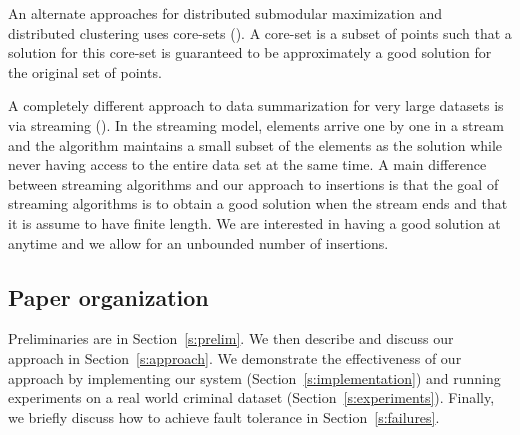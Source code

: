 	An alternate approaches for distributed submodular maximization and distributed clustering uses core-sets (\citet{mirrokni2015randomized, indyk2014composable, balcan2013distributed,bateni2014distributed}). A core-set is a subset of points such that a solution for this core-set is guaranteed to be approximately a good solution for the original set of points.  
	
	A completely different approach to data summarization for very large datasets is via streaming (\citet{badanidiyuru2014streaming,kumar2015fast}). In the streaming model,  elements arrive one by one in a stream and the algorithm maintains a small subset of the elements as the solution while never having access to the entire data set at the same time. A main difference between streaming algorithms and our approach to insertions is that the goal of streaming algorithms is to obtain a good solution when the stream ends and that it is assume to have finite length. We are interested in having a good solution at anytime and we allow for an unbounded number of insertions.
	
	\subsection{Paper organization}
	
	Preliminaries are in Section~\ref{s:prelim}. We then describe and discuss our approach in Section~\ref{s:approach}. We demonstrate the effectiveness of our approach by implementing our system (Section~\ref{s:implementation}) and running experiments on a real world criminal dataset (Section~\ref{s:experiments}). Finally, we briefly discuss how to achieve fault tolerance in Section~\ref{s:failures}.